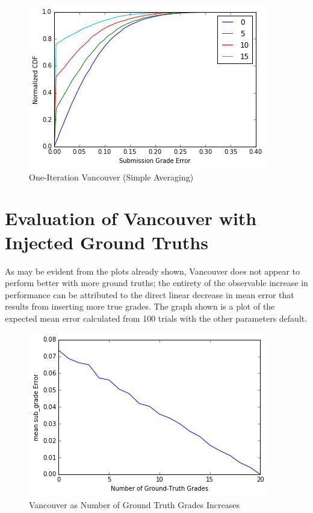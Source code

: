 \documentclass{article}
\begin{document}
	\begin{figure}[h]
		\includegraphics{vancouver-1-step.png}
		\caption{One-Iteration Vancouver (Simple Averaging)}
	\end{figure}
	

	\section{Evaluation of Vancouver with Injected Ground Truths}
	As may be evident from the plots already shown, Vancouver does not appear to perform better with more ground truths; the entirety of the observable increase in performance can be attributed to the direct linear decrease in mean error that results from inserting more true grades. The graph shown is a plot of the expected mean error calculated from 100 trials with the other parameters default.
	
	\begin{figure}[h]
		\includegraphics{vancouver-vs-ground-truth-cover.png}
		\caption{Vancouver as Number of Ground Truth Grades Increases}
	\end{figure}
	
\end{document}
